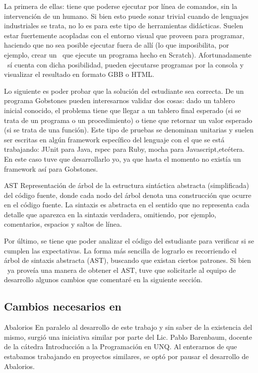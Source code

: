 La primera de ellas: tiene que poderse ejecutar por línea de comandos, sin la intervención de un humano. Si bien esto puede sonar trivial cuando de lenguajes industriales se trata, no lo es para este tipo de herramientas didácticas. Suelen estar fuertemente acopladas con el entorno visual que proveen para programar, haciendo que no sea posible ejecutar fuera de allí (lo que imposibilita, por ejemplo, crear un \runner\ que ejecute un programa hecho en Scratch). Afortunadamente \pyGob\ sí cuenta con dicha posibilidad, pueden ejecutarse programas por la consola y visualizar el resultado en formato GBB o HTML.

Lo siguiente es poder probar que la solución del estudiante sea correcta. De un programa Gobstones pueden interesarnos validar dos cosas: dado un tablero inicial conocido, el problema tiene que llegar a un tablero final esperado (si se trata de un programa o un procedimiento) o tiene que retornar un valor esperado (si se trata de una función). Este tipo de pruebas se denominan unitarias y suelen ser escritas en algún framework específico del lenguaje con el que se está trabajando: JUnit para Java, rspec para Ruby, mocha para Javascript,etcétera. En este caso tuve que desarrollarlo yo, ya que hasta el momento no existía un framework así para Gobstones.

\sepfootnotecontent
  {AST}
  {Representación de árbol de la estructura sintáctica abstracta (simplificada) del código fuente, donde cada nodo del árbol denota una construcción que ocurre en el código fuente. La sintaxis es abstracta en el sentido que no representa cada detalle que aparezca en la sintaxis verdadera, omitiendo, por ejemplo, comentarios, espacios y saltos de línea.}

Por último, se tiene que poder analizar el código del estudiante para verificar si se cumplen las expectativas. La forma más sencilla de lograrlo es recorriendo el árbol de sintaxis abstracta (AST), buscando que existan ciertos patrones. Si bien \pyGob\ ya proveía una manera de obtener el AST, tuve que solicitarle al equipo de desarrollo algunos cambios que comentaré en la siguiente sección.

\subsection{Cambios necesarios en \pyGob}
\sepfootnotecontent
  {Abalorios}
  {En paralelo al desarrollo de este trabajo y sin saber de la existencia del mismo, surgió una iniciativa similar por parte del Lic. Pablo Barenbaum, docente de la cátedra Introducción a la Programación en UNQ. Al enterarnos de que estabamos trabajando en proyectos similares, se optó por pausar el desarrollo de Abalorios.}

